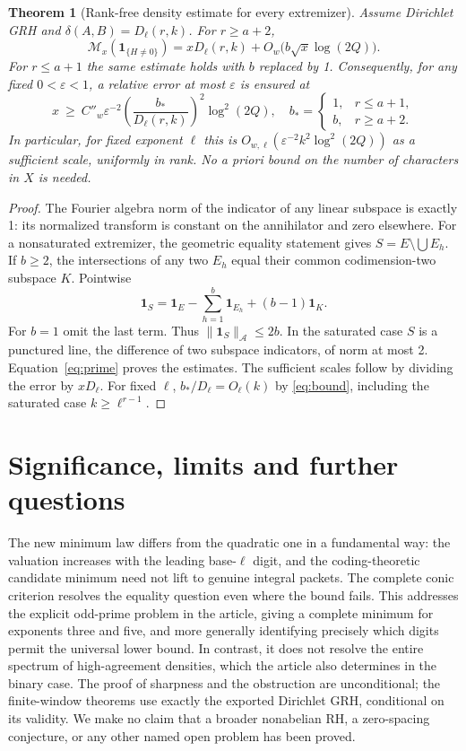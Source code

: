 \documentclass[11pt]{article}
\newtheorem{theorem}{Theorem}[section]
\theoremstyle{remark}\newtheorem{remark}[theorem]{Remark}
\newcommand{\one}{\mathbf 1}
\begin{document}
\begin{theorem}[Rank-free density estimate for every extremizer]\label{thm:window}
Assume Dirichlet GRH and $\delta(A,B)=D_\ell(r,k)$. For $r\ge a+2$,
\[
 \mathcal M_x(\one_{\{H\ne0\}})=xD_\ell(r,k)+O_w\bigl(b\sqrt{x}\log(2Q)\bigr).
\]
For $r\le a+1$ the same estimate holds with $b$ replaced by 1. Consequently, for any fixed $0<\varepsilon<1$, a relative error at most $\varepsilon$ is ensured at
\[
 x\ \ge\ C''_w\varepsilon^{-2}\left(\frac{b_*}{D_\ell(r,k)}\right)^2\log^2(2Q),
 \quad b_*=\begin{cases}1,&r\le a+1,\\ b,&r\ge a+2.\end{cases}
\]
In particular, for fixed exponent $\ell$ this is $O_{w,\ell}(\varepsilon^{-2}k^2\log^2(2Q))$ as a sufficient scale, uniformly in rank. No a priori bound on the number of characters in $X$ is needed.
\end{theorem}
\begin{proof}
The Fourier algebra norm of the indicator of any linear subspace is exactly 1: its normalized transform is constant on the annihilator and zero elsewhere. For a nonsaturated extremizer, the geometric equality statement gives $S=E\setminus\bigcup E_h$. If $b\ge2$, the intersections of any two $E_h$ equal their common codimension-two subspace $K$. Pointwise
\[
 \one_S=\one_E-\sum_{h=1}^b\one_{E_h}+(b-1)\one_K.
\]
For $b=1$ omit the last term. Thus $\|\one_S\|_{\mathcal A}\le2b$. In the saturated case $S$ is a punctured line, the difference of two subspace indicators, of norm at most 2. Equation~\eqref{eq:prime} proves the estimates. The sufficient scales follow by dividing the error by $xD_\ell$. For fixed $\ell$, $b_*/D_\ell=O_\ell(k)$ by \eqref{eq:bound}, including the saturated case $k\ge\ell^{r-1}$.
\end{proof}

\section{Significance, limits and further questions}
The new minimum law differs from the quadratic one in a fundamental way: the valuation increases with the leading base-$\ell$ digit, and the coding-theoretic candidate minimum need not lift to genuine integral packets. The complete conic criterion resolves the equality question even where the bound fails. This addresses the explicit odd-prime problem in the article, giving a complete minimum for exponents three and five, and more generally identifying precisely which digits permit the universal lower bound. In contrast, it does not resolve the entire spectrum of high-agreement densities, which the article also determines in the binary case. The proof of sharpness and the obstruction are unconditional; the finite-window theorems use exactly the exported Dirichlet GRH, conditional on its validity. We make no claim that a broader nonabelian RH, a zero-spacing conjecture, or any other named open problem has been proved.
\end{document}
